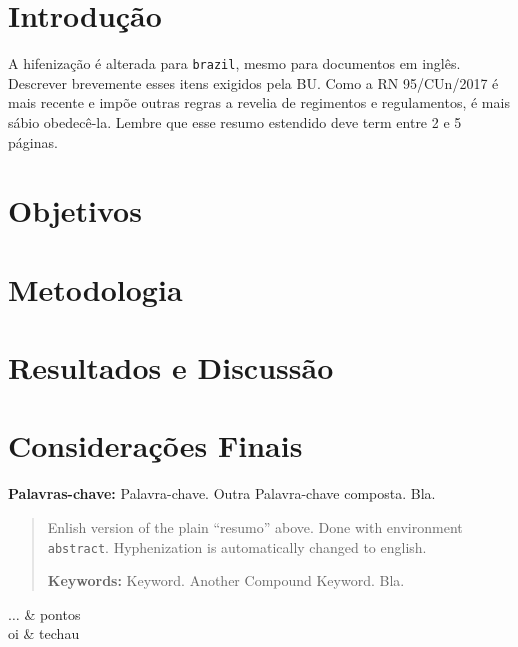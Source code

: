 \documentclass[brazil, english]{ufsc-thesis-rn46-2019}
\begin{document}
\begin{resumo}
  \section*{Introdução} 
  A hifenização é alterada para \texttt{brazil}, mesmo para documentos em inglês. Descrever brevemente esses itens exigidos pela BU. Como a RN 95/CUn/2017 é mais recente e impõe outras regras a revelia de regimentos e regulamentos, é mais sábio obedecê-la. Lembre que esse resumo estendido deve term entre 2 e 5 páginas.
  
  \lipsum[1]
  \section*{Objetivos} 
  \lipsum[2]
  \section*{Metodologia} 
  \lipsum[3]
  \section*{Resultados e Discussão} 
  \lipsum[4]
  \section*{Considerações Finais} 
  \lipsum[5]

  \vspace{\baselineskip}  %
  \textbf{Palavras-chave:} Palavra-chave. Outra Palavra-chave composta. Bla.
\end{resumo}


\begin{abstract}
  Enlish version of the plain ``resumo'' above. Done with environment
  \texttt{abstract}. Hyphenization is automatically changed to english.

  \vspace{\baselineskip} 
  \textbf{Keywords:} Keyword. Another Compound Keyword. Bla.
\end{abstract}

\listoffigures*

\begin{listadesimbolos}
$\dots$ & pontos \\
oi & techau
\end{listadesimbolos}

\tableofcontents*%

\textual%
\end{document}
